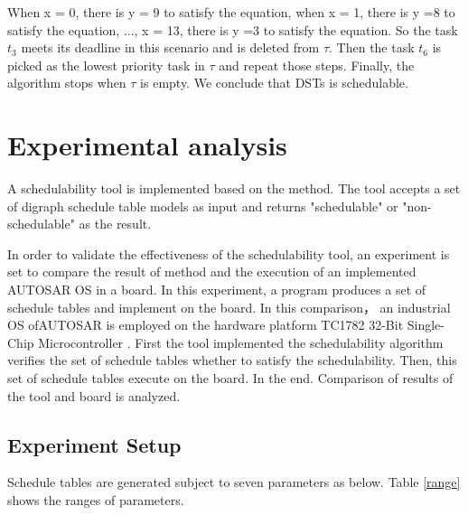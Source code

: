 \documentclass[10pt,conference]{IEEEtran}
\begin{document}
{When x = 0, there is y = 9 to satisfy the equation, when x = 1, there is y =8 to satisfy the equation, ..., x = 13, there is y =3 to satisfy the equation. So the task $t_3$ meets its deadline in this scenario and is deleted from $\tau$. Then the task $t_6$ is picked as the lowest priority task in $\tau$ and repeat those steps. Finally, the algorithm stops when $\tau$ is empty. We conclude that DSTs is schedulable. 


\section{Experimental analysis}
A schedulability tool is implemented based on the method. The tool accepts a set of digraph schedule table models as input and returns "schedulable" or "non-schedulable" as the result.

In order to validate the effectiveness of the schedulability tool, an experiment is set to compare the result of method and the execution of an implemented AUTOSAR OS in a board. In this experiment, a program produces a set of schedule tables and implement on the board. In this comparison， an industrial OS ofAUTOSAR is employed on the hardware platform TC1782 32-Bit Single-Chip Microcontroller \cite{infineon.org}. First the tool implemented the schedulability algorithm verifies the set of schedule tables whether to satisfy the schedulability. Then, this set of schedule tables execute on the board. In the end. Comparison of results of the tool and board is analyzed.
\subsection{Experiment Setup}
Schedule tables are generated subject to seven parameters as below. Table \ref{range} shows the ranges of parameters. 

}
\end{document}
